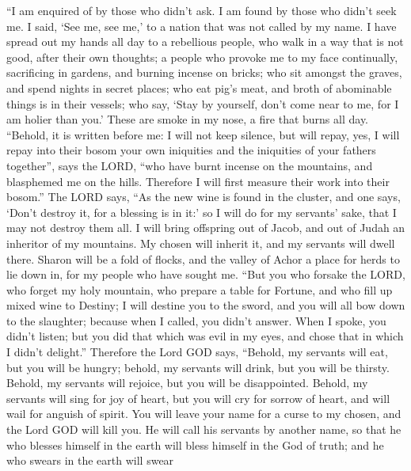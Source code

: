  ``I am enquired of by those who didn't ask. I am found by
those who didn't seek me. I said, `See me, see me,' to a nation that was
not called by my name.  I have spread out my hands all day
to a rebellious people, who walk in a way that is not good, after their
own thoughts;  a people who provoke me to my face
continually, sacrificing in gardens, and burning incense on bricks;
 who sit amongst the graves, and spend nights in secret
places; who eat pig's meat, and broth of abominable things is in their
vessels;  who say, `Stay by yourself, don't come near to me,
for I am holier than you.' These are smoke in my nose, a fire that burns
all day.  ``Behold, it is written before me: I will not keep
silence, but will repay, yes, I will repay into their bosom 
your own iniquities and the iniquities of your fathers together'', says
the LORD, ``who have burnt incense on the mountains, and blasphemed me
on the hills. Therefore I will first measure their work into their
bosom.''  The LORD says, ``As the new wine is found in the
cluster, and one says, `Don't destroy it, for a blessing is in it:' so I
will do for my servants' sake, that I may not destroy them all.
 I will bring offspring out of Jacob, and out of Judah an
inheritor of my mountains. My chosen will inherit it, and my servants
will dwell there.  Sharon will be a fold of flocks, and the
valley of Achor a place for herds to lie down in, for my people who have
sought me.  ``But you who forsake the LORD, who forget my
holy mountain, who prepare a table for Fortune, and who fill up mixed
wine to Destiny;  I will destine you to the sword, and you
will all bow down to the slaughter; because when I called, you didn't
answer. When I spoke, you didn't listen; but you did that which was evil
in my eyes, and chose that in which I didn't delight.'' 
Therefore the Lord GOD says, ``Behold, my servants will eat, but you
will be hungry; behold, my servants will drink, but you will be thirsty.
Behold, my servants will rejoice, but you will be disappointed.
 Behold, my servants will sing for joy of heart, but you
will cry for sorrow of heart, and will wail for anguish of spirit.
 You will leave your name for a curse to my chosen, and the
Lord GOD will kill you. He will call his servants by another name,
 so that he who blesses himself in the earth will bless
himself in the God of truth; and he who swears in the earth will swear
